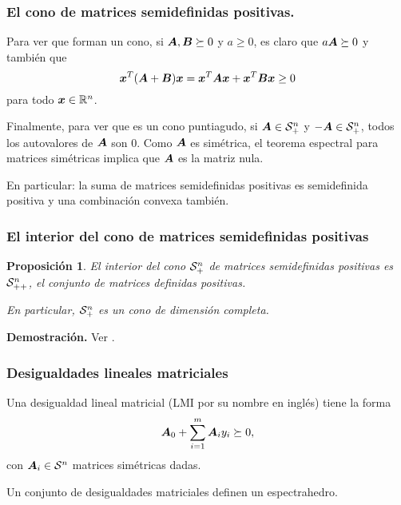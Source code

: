 \documentclass[aspectratio=169,12pt,spanish]{beamer}
\newtheorem{proposition}[theorem]{Proposición}
\begin{document}

\begin{frame}
\frametitle{El cono de matrices semidefinidas positivas.}

Para ver que forman un cono, si $\bm{A}, \bm{B} \succeq 0$ y $a \ge 0$, es claro que $a \bm{A} \succeq 0$ y también que
$$\bm{x}^T (\bm{A} + \bm{B}) \bm{x} = \bm{x}^T \bm{A} \bm{x} + \bm{x}^T \bm{B} \bm{x} \ge 0$$
 para todo $\bm{x} \in \mathbb{R}^n$.

Finalmente, para ver que es un cono puntiagudo, si $\bm{A} \in {\mathcal S_+^n}$ y $-\bm{A} \in {\mathcal S_+^n}$, todos los autovalores de $\bm{A}$ son $0$. Como $\bm{A}$ es simétrica, el teorema espectral para matrices simétricas implica que $\bm{A}$ es la matriz nula.

En particular: la suma de matrices semidefinidas positivas es semidefinida positiva y una combinación convexa también.
\end{frame}


\begin{frame}
\frametitle{El interior del cono de matrices semidefinidas positivas}

\begin{proposition}
El interior del cono ${\mathcal S_+^n}$ de matrices semidefinidas positivas es ${\mathcal S_{++}^n}$, el conjunto de matrices definidas positivas.

En particular, ${\mathcal S_+^n}$ es un cono de dimensión completa.
\end{proposition}


\textbf{Demostración.}
Ver \cite[Teorema 3.1]{Fawzi2018}.

\end{frame}


\begin{frame}
\frametitle{Desigualdades lineales matriciales}


\begin{definition}
  Una desigualdad lineal matricial (LMI por su nombre en inglés) tiene la forma
  $$\bm{A}_0 + \sum_{i = 1}^m \bm{A}_i y_i \succeq 0,$$
  con $\bm{A}_i \in {\mathcal S}^n$ matrices simétricas dadas.
\end{definition}

Un conjunto de desigualdades matriciales definen un espectrahedro.

\end{frame}
\end{document}
